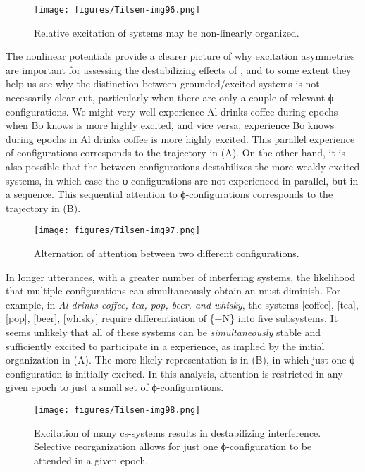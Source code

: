   
\begin{figure}
\texttt{[image: figures/Tilsen-img96.png]}
\caption{Relative excitation of systems may be non-linearly organized.}
\label{fig:4:46}
\end{figure}
   

  The nonlinear potentials provide a clearer picture of why excitation asymmetries are important for assessing the destabilizing effects of , and to some extent they help us see why the distinction between grounded/excited systems is not necessarily clear cut, particularly when there are only a couple of relevant ϕ-con\-fig\-u\-ra\-tions. We might very well experience {\textbar}Al drinks coffee{\textbar} during epochs when {\textbar}Bo knows{\textbar} is more highly excited, and vice versa, experience {\textbar}Bo knows{\textbar} during epochs in {\textbar}Al drinks coffee{\textbar} is more highly excited. This parallel experience of configurations corresponds to the trajectory in {}(A). On the other hand, it is also possible that the  between configurations destabilizes the more weakly excited systems, in which case the ϕ-con\-fig\-u\-ra\-tions are not experienced in parallel, but in a sequence. This sequential attention to ϕ-con\-fig\-u\-ra\-tions corresponds to the trajectory in {}(B).

  
\begin{figure}
\texttt{[image: figures/Tilsen-img97.png]}
\caption{Alternation of attention between two different configurations.}
\label{fig:4:47}
\end{figure}
 

  In longer utterances, with a greater number of interfering systems, the likelihood that multiple configurations can simultaneously obtain an  must diminish. For example, in \textit{Al drinks coffee, tea, pop, beer, and whisky}, the systems [coffee], [tea], [pop], [beer], [whisky] require differentiation of \{−N\} into five subsystems. It seems unlikely that all of these systems can be \textit{simultaneously} stable and sufficiently excited to participate in a  experience, as implied by the initial organization in {}(A). The more likely representation is in (B), in which just one ϕ-con\-fig\-u\-ra\-tion is initially excited. In this analysis, attention is restricted in any given epoch to just a small set of ϕ-con\-fig\-u\-ra\-tions.

  
\begin{figure}
\texttt{[image: figures/Tilsen-img98.png]}
\caption{Excitation of many cs-systems results in destabilizing interference. Selective reorganization allows for just one ϕ-con\-fig\-u\-ra\-tion to be attended in a given epoch.}
\label{fig:4:48}
\end{figure}\clearpage
 

